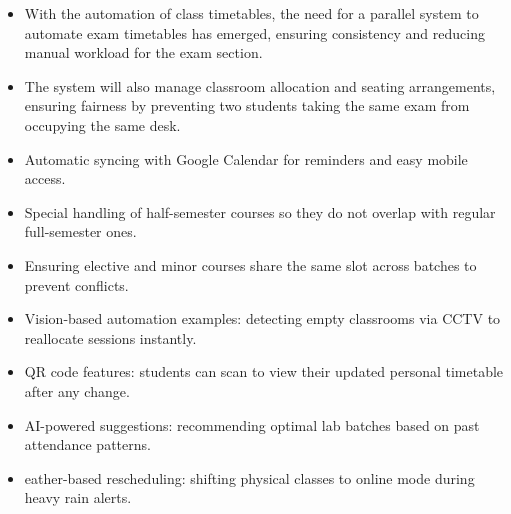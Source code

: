 \documentclass[12pt]{article}
\begin{document}
\begin{itemize}
\item  With the automation of class timetables, the need for a parallel system to automate exam timetables has emerged, ensuring consistency and reducing manual workload for the exam section.

\item The system will also manage classroom allocation and seating arrangements, ensuring fairness by preventing two students taking the same exam from occupying the same desk.

\item Automatic syncing with Google Calendar for reminders and easy mobile access.

\item Special handling of half-semester courses so they do not overlap with regular full-semester ones.

\item Ensuring elective and minor courses share the same slot across batches to prevent conflicts.

\item Vision-based automation examples: detecting empty classrooms via CCTV to reallocate sessions instantly.

\item QR code features: students can scan to view their updated personal timetable after any change.

\item AI-powered suggestions: recommending optimal lab batches based on past attendance patterns.


\item eather-based rescheduling: shifting physical classes to online mode during heavy rain alerts.
\end{itemize}
\newpage
\end{document}
